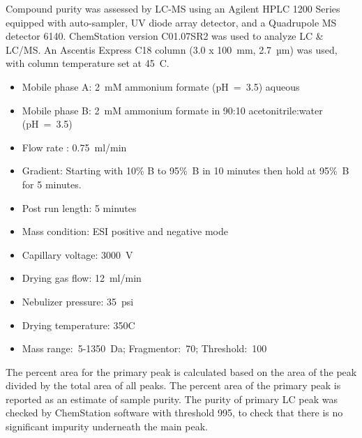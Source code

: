 \documentclass[9pt,lineno]{elife}
\begin{document}
Compound purity was assessed by LC-MS using an Agilent HPLC 1200 Series equipped with auto-sampler, UV diode array detector, and a Quadrupole MS detector 6140. 
ChemStation version C01.07SR2 was used to analyze LC \& LC/MS.
An Ascentis Express C18 column (3.0 x 100~mm, 2.7~µm) was used, with column temperature set at 45\textdegree~C.
\begin{itemize}
\item Mobile phase A: 2~mM ammonium formate (pH~=~3.5) aqueous
\item Mobile phase B: 2~mM ammonium formate in 90:10 acetonitrile:water~ (pH~=~3.5)
\item Flow rate : 0.75~ml/min
\item Gradient: Starting with 10\% B to 95\%~B in 10 minutes then hold at 95\%~B for 5 minutes. 
\item Post run length: 5 minutes 
\item Mass condition: ESI positive and negative mode
\item Capillary voltage: 3000~V
\item Drying gas flow: 12~ml/min
\item Nebulizer pressure: 35~psi
\item Drying temperature: 350\textdegree C
\item Mass range:~5-1350~Da; Fragmentor:~70; Threshold:~100
\end{itemize}

The percent area for the primary peak is calculated based on the area of the peak divided by the total area of all peaks. 
The percent area of the primary peak is reported as an estimate of sample purity. 
The purity of primary LC peak was checked by ChemStation software with threshold 995, to check that there is no significant impurity underneath the main peak. 
\end{document}
